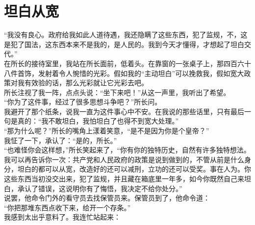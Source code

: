 \fancyhead[RO]{\thepage} %
\fancyhead[LE]{\thepage} %
\chapter*{坦白从宽}
“我没有良心。政府给我如此人道待遇，我还隐瞒了这些东西，犯了监规，不，这是犯了国法，这东西本来不是我的，是人民的。我到今天才懂得，才想起了坦白交代。”\\

在所长的接待室里，我站在所长面前，低着头。在靠窗的一张桌子上，那四百六十八件首饰，发射着令人惋惜的光彩。假如我的“主动坦白”可以挽救我，假如宽大政策对我有效验的话，那么光彩就让它光彩去吧。\\

所长注视了我一阵，点点头说：“坐下来吧！”从这一声里，我听出了希望。\\

“你为了这件事，经过了很多思想斗争吧？”所长问。\\

我避开了那个纸条，说我一直为这件事心中不安。在我说的那些话里，只有最后一句是真的：“我不敢坦白，我怕坦白了也得不到宽大处理。”\\

“那为什么呢？”所长的嘴角上漾着笑意，“是不是因为你是个皇帝？”\\

我怔了一下，承认了：“是的，所长。”\\

“也难怪你会这样想，”所长笑起来了，“你有你的独特历史，自然有许多独特想法。我可以再告诉你一次：共产党和人民政府的政策是说到做到的，不管从前是什么身分，坦白的都可以从宽，改造好的还可以减刑，立功的还可以受奖。事在人为。你这些东西当初没交出来，犯了监规，并且藏在箱底里一年多，如今你既然自己来坦白，承认了错误，这说明你有了悔悟，我决定不给你处分。”\\

说罢，他命令门外的看守员去找保管员来。保管员到了，他命令道：\\

“你把那堆东西点收下来，给开一个存条。”\\

我感到太出乎意料了。我连忙站起来：\\


